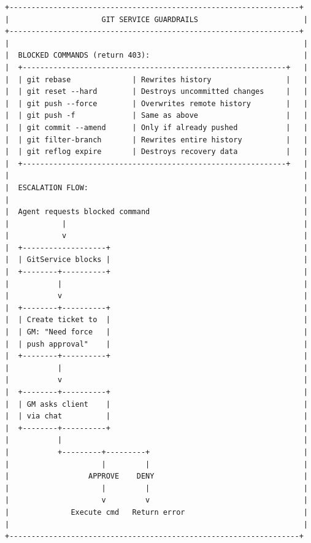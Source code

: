 \documentclass[11pt,a4paper]{article}
\begin{document}
\begin{verbatim}
+------------------------------------------------------------------+
|                     GIT SERVICE GUARDRAILS                        |
+------------------------------------------------------------------+
|                                                                   |
|  BLOCKED COMMANDS (return 403):                                   |
|  +------------------------------------------------------------+   |
|  | git rebase              | Rewrites history                 |   |
|  | git reset --hard        | Destroys uncommitted changes     |   |
|  | git push --force        | Overwrites remote history        |   |
|  | git push -f             | Same as above                    |   |
|  | git commit --amend      | Only if already pushed           |   |
|  | git filter-branch       | Rewrites entire history          |   |
|  | git reflog expire       | Destroys recovery data           |   |
|  +------------------------------------------------------------+   |
|                                                                   |
|  ESCALATION FLOW:                                                 |
|                                                                   |
|  Agent requests blocked command                                   |
|            |                                                      |
|            v                                                      |
|  +-------------------+                                            |
|  | GitService blocks |                                            |
|  +--------+----------+                                            |
|           |                                                       |
|           v                                                       |
|  +--------+----------+                                            |
|  | Create ticket to  |                                            |
|  | GM: "Need force   |                                            |
|  | push approval"    |                                            |
|  +--------+----------+                                            |
|           |                                                       |
|           v                                                       |
|  +--------+----------+                                            |
|  | GM asks client    |                                            |
|  | via chat          |                                            |
|  +--------+----------+                                            |
|           |                                                       |
|           +---------+---------+                                   |
|                     |         |                                   |
|                  APPROVE    DENY                                  |
|                     |         |                                   |
|                     v         v                                   |
|              Execute cmd   Return error                           |
|                                                                   |
+------------------------------------------------------------------+
\end{verbatim}
\end{document}
